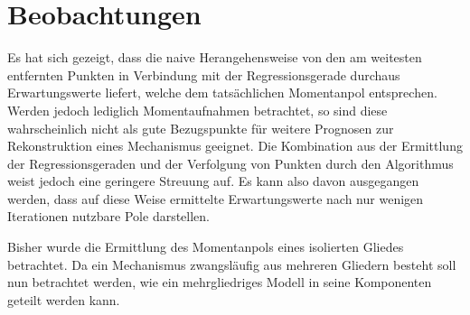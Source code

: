 \section{Beobachtungen}

Es hat sich gezeigt, dass die naive Herangehensweise von den am weitesten entfernten Punkten in Verbindung mit der Regressionsgerade durchaus Erwartungswerte liefert, welche dem tatsächlichen Momentanpol entsprechen.
Werden jedoch lediglich Momentaufnahmen betrachtet, so sind diese wahrscheinlich nicht als gute Bezugspunkte für weitere Prognosen zur Rekonstruktion eines Mechanismus geeignet.
Die Kombination aus der Ermittlung der Regressionsgeraden und der Verfolgung von Punkten durch den  Algorithmus weist jedoch eine geringere Streuung auf.
Es kann also davon ausgegangen werden, dass auf diese Weise ermittelte Erwartungswerte nach nur wenigen Iterationen nutzbare Pole darstellen.

Bisher wurde die Ermittlung des Momentanpols eines isolierten Gliedes betrachtet.
Da ein Mechanismus zwangsläufig aus mehreren Gliedern besteht soll nun betrachtet werden, wie ein mehrgliedriges Modell in seine Komponenten geteilt werden kann.
